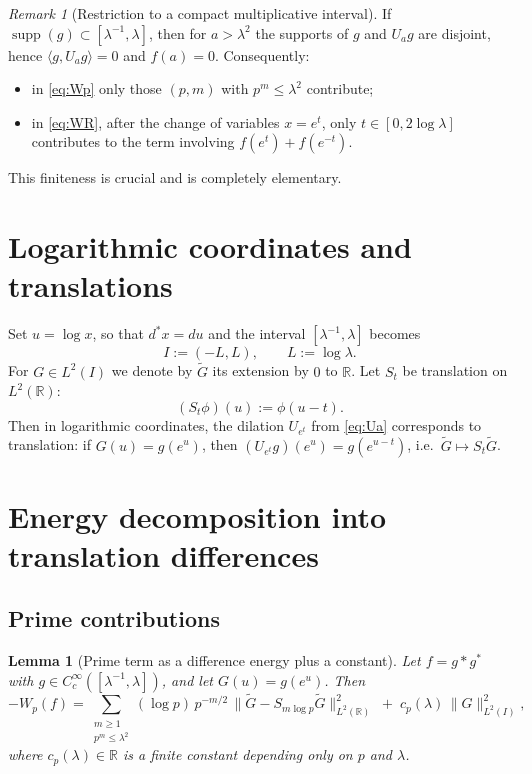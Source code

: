 \documentclass[11pt]{article}
\newtheorem{lemma}[theorem]{Lemma}
\theoremstyle{remark}
\newtheorem{remark}[theorem]{Remark}
\newcommand{\R}{\mathbb R}
\newcommand{\1}{\mathbf 1}
\begin{document}
\begin{remark}[Restriction to a compact multiplicative interval]
\label{rem:truncate}
If $\operatorname{supp}(g)\subset[\lambda^{-1},\lambda]$, then for $a>\lambda^2$
the supports of $g$ and $U_ag$ are disjoint, hence $\langle g,U_ag\rangle=0$ and
$f(a)=0$. Consequently:
\begin{itemize}
\item in \eqref{eq:Wp} only those $(p,m)$ with $p^m\le \lambda^2$ contribute;
\item in \eqref{eq:WR}, after the change of variables $x=e^t$, only $t\in[0,2\log\lambda]$
contributes to the term involving $f(e^t)+f(e^{-t})$.
\end{itemize}
This finiteness is crucial and is completely elementary.
\end{remark}

\section{Logarithmic coordinates and translations}

Set $u=\log x$, so that $d^*x=du$ and the interval $[\lambda^{-1},\lambda]$ becomes
\[
I:=(-L,L),\qquad L:=\log\lambda.
\]
For $G\in L^2(I)$ we denote by $\widetilde G$ its extension by $0$ to $\R$.
Let $S_t$ be translation on $L^2(\R)$:
\[
(S_t\phi)(u):=\phi(u-t).
\]
Then in logarithmic coordinates, the dilation $U_{e^t}$ from \eqref{eq:Ua} corresponds to
translation: if $G(u)=g(e^u)$, then $(U_{e^t}g)(e^u)=g(e^{u-t})$, i.e.\ $\widetilde G\mapsto S_t\widetilde G$.

\section{Energy decomposition into translation differences}

\subsection{Prime contributions}
\begin{lemma}[Prime term as a difference energy plus a constant]
\label{lem:prime-energy}
Let $f=g*g^*$ with $g\in C_c^\infty([\lambda^{-1},\lambda])$, and let $G(u)=g(e^u)$.
Then
\[
-W_p(f)
=\sum_{\substack{m\ge 1\\ p^m\le \lambda^2}} (\log p)\,p^{-m/2}\,\|\widetilde G-S_{m\log p}\widetilde G\|_{L^2(\R)}^2
\;+\;c_p(\lambda)\,\|G\|_{L^2(I)}^2,
\]
where $c_p(\lambda)\in \R$ is a finite constant depending only on $p$ and $\lambda$.
\end{lemma}
\end{document}
